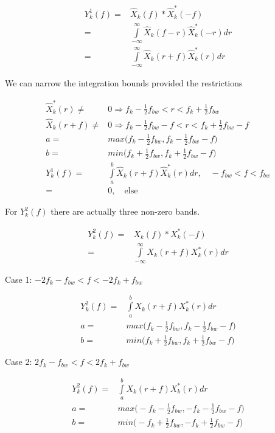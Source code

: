 \documentclass [11pt, proquest,oneside] {ganter_thesis}[2015/03/03]
\begin{document}
\begin{align}
Y_{k}^1(f) =& \widehat{X}_{k}(f) * \widehat{X}_{k}^*(-f) \\
=& \int\limits_{-\infty}^{\infty} \widehat{X}_{k}(f - r) \widehat{X}_{k}^*(-r)dr \\
=& \int\limits_{-\infty}^{\infty} \widehat{X}_{k}(r + f) \widehat{X}_{k}^*(r)dr
\end{align}

We can narrow the integration bounds provided the restrictions

\begin{align}
\widehat{X}_{k}^*(r) \neq& 0 \Rightarrow  f_k - \frac{1}{2} f_{bw} < r < f_k + \frac{1}{2} f_{bw} \\
\widehat{X}_{k}(r + f) \neq& 0 \Rightarrow  f_k - \frac{1}{2} f_{bw} - f < r < f_k + \frac{1}{2} f_{bw} - f \\
a =& max\Big( f_k - \frac{1}{2} f_{bw},  f_k - \frac{1}{2} f_{bw} - f\Big) \\
b =& min\Big( f_k + \frac{1}{2} f_{bw},  f_k + \frac{1}{2} f_{bw} - f\Big) \\
Y_{k}^1(f) =& \int\limits_{a}^{b} \widehat{X}_{k}(r + f) \widehat{X}_{k}^*(r)dr, \quad -f_{bw} < f < f_{bw} \\
=& 0, \quad \mathrm{else}
\end{align}

For $Y_k^2(f)$ there are actually three non-zero bands.

\begin{align}
Y_{k}^2(f) =& X_{k}(f) * X_{k}^*(-f) \\
=& \int\limits_{-\infty}^{\infty} X_{k}(r + f) X_{k}^*(r)dr
\end{align}

Case 1: $-2f_k - f_{bw} < f < -2f_k + f_{bw}$

\begin{align}
Y_{k}^2(f) =& \int\limits_{a}^{b} X_{k}(r + f) X_{k}^*(r)dr \\
a =& max\Big( f_k - \frac{1}{2} f_{bw},  f_k - \frac{1}{2} f_{bw} - f\Big) \\
b =& min\Big( f_k + \frac{1}{2} f_{bw},  f_k + \frac{1}{2} f_{bw} - f\Big)
\end{align}

Case 2: $2f_k - f_{bw} < f < 2f_k + f_{bw}$

\begin{align}
Y_{k}^2(f) =& \int\limits_{a}^{b} X_{k}(r + f) X_{k}^*(r)dr \\
a =& max\Big( -f_k - \frac{1}{2} f_{bw},  -f_k - \frac{1}{2} f_{bw} - f\Big) \\
b =& min\Big( -f_k + \frac{1}{2} f_{bw},  -f_k + \frac{1}{2} f_{bw} - f\Big)
\end{align}
\end{document}
